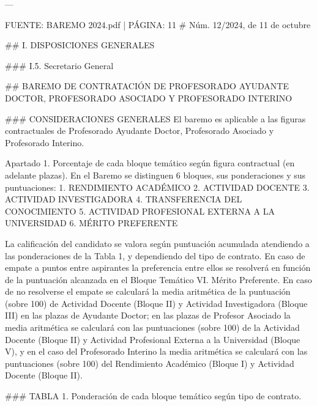 \documentclass{article}
\begin{document}
\begin{itemize}
\begin{itemize}
\begin{scriptsize}
                  ---

                  FUENTE: BAREMO 2024.pdf | PÁGINA: 11
                  \# Núm. 12/2024, de 11 de octubre

                  \#\# I. DISPOSICIONES GENERALES

                  \#\#\# I.5. Secretario General

                  \#\# BAREMO DE CONTRATACIÓN DE PROFESORADO AYUDANTE DOCTOR, PROFESORADO ASOCIADO Y PROFESORADO INTERINO

                  \#\#\# CONSIDERACIONES GENERALES
                  El baremo es aplicable a las figuras contractuales de Profesorado Ayudante Doctor, Profesorado Asociado y Profesorado Interino.

                  Apartado 1. Porcentaje de cada bloque temático según figura contractual (en adelante plazas).
                  En el Baremo se distinguen 6 bloques, sus ponderaciones y sus puntuaciones:
                  1. RENDIMIENTO ACADÉMICO
                  2. ACTIVIDAD DOCENTE
                  3. ACTIVIDAD INVESTIGADORA
                  4. TRANSFERENCIA DEL CONOCIMIENTO
                  5. ACTIVIDAD PROFESIONAL EXTERNA A LA UNIVERSIDAD
                  6. MÉRITO PREFERENTE

                  La calificación del candidato se valora según puntuación acumulada atendiendo a las ponderaciones de la Tabla 1, y dependiendo del tipo de contrato. En caso de empate a puntos entre aspirantes la preferencia entre ellos se resolverá en función de la puntuación alcanzada en el Bloque Temático VI. Mérito Preferente. En caso de no resolverse el empate se calculará la media aritmética de la puntuación (sobre 100) de Actividad Docente (Bloque II) y Actividad Investigadora (Bloque III) en las plazas de Ayudante Doctor; en las plazas de Profesor Asociado la media aritmética se calculará con las puntuaciones (sobre 100) de la Actividad Docente (Bloque II) y Actividad Profesional Externa a la Universidad (Bloque V), y en el caso del Profesorado Interino la media aritmética se calculará con las puntuaciones (sobre 100) del Rendimiento Académico (Bloque I) y Actividad Docente (Bloque II).

                  \#\#\# TABLA 1. Ponderación de cada bloque temático según tipo de contrato.


\end{scriptsize}
\end{itemize}
\end{itemize}
\end{document}
